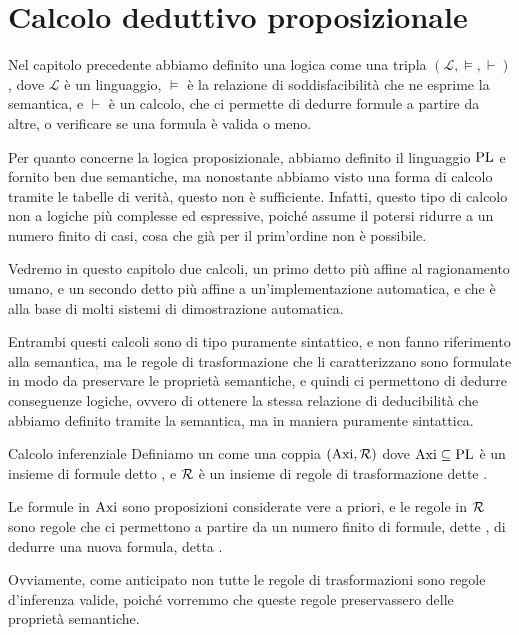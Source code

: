 \chapter{Calcolo deduttivo proposizionale}

Nel capitolo precedente abbiamo definito una logica come una tripla \((\mathcal{L}, \models, \vdash)\), dove \(\mathcal{L}\) è un linguaggio, \(\models\) è la relazione di soddisfacibilità che ne esprime la semantica, e \(\vdash\) è un calcolo, che ci permette di dedurre formule a partire da altre, o verificare se una formula è valida o meno.

Per quanto concerne la logica proposizionale, abbiamo definito il linguaggio \(\operatorname{PL}\) e fornito ben due semantiche, ma nonostante abbiamo visto una forma di calcolo tramite le tabelle di verità, questo non è sufficiente.
Infatti, questo tipo di calcolo non  a logiche più complesse ed espressive, poiché assume il potersi ridurre a un numero finito di casi, cosa che già per il prim'ordine non è possibile.

Vedremo in questo capitolo due calcoli, un primo detto  più affine al ragionamento umano, e un secondo detto  più affine a un'implementazione automatica, e che è alla base di molti sistemi di dimostrazione automatica.

Entrambi questi calcoli sono di tipo puramente sintattico, e non fanno riferimento alla semantica, ma le regole di trasformazione che li caratterizzano sono formulate in modo da preservare le proprietà semantiche, e quindi ci permettono di dedurre conseguenze logiche, ovvero di ottenere la stessa relazione di deducibilità che abbiamo definito tramite la semantica, ma in maniera puramente sintattica.

\begin{definition}{Calcolo inferenziale}
  Definiamo un  come una coppia \((\operatorname{Axi}, \mathcal{R})\) dove \(\operatorname{Axi} \subseteq \operatorname{PL}\) è un insieme di formule detto , e \(\mathcal{R}\) è un insieme di regole di trasformazione dette .

  Le formule in \(\operatorname{Axi}\) sono proposizioni considerate vere a priori, e le regole in \(\mathcal{R}\) sono regole che ci permettono a partire da un numero finito di formule, dette , di dedurre una nuova formula, detta .
\end{definition}

Ovviamente, come anticipato non tutte le regole di trasformazioni sono regole d'inferenza valide, poiché vorremmo che queste regole preservassero delle proprietà semantiche.


